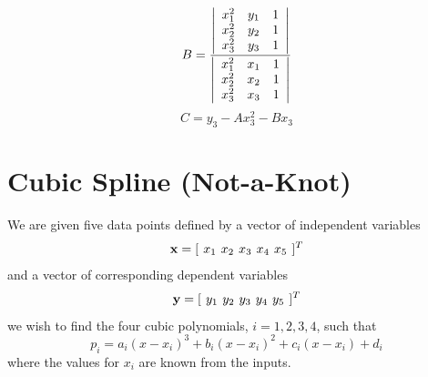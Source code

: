 %
\begin{equation}
    B = \frac{
    \left|%
    \begin{array}{ccc}
     x_1^2 & y_1 & 1 \\
     x_2^2 & y_2 & 1 \\
     x_3^2 & y_3 & 1 \\
    \end{array}%
    \right|
    }
    {    \left|%
    \begin{array}{ccc}
       x_1^2 & x_1 & 1 \\
       x_2^2 & x_2 & 1 \\
       x_3^2 & x_3 & 1 \\
    \end{array}%
    \right|}
\end{equation}
%
\begin{equation}
    C = y_3 - A x_3^2 - B x_3
\end{equation}

\section{Cubic Spline (Not-a-Knot) }

We are given five data points defined by a vector of independent
variables
%
\begin{equation}
     \mathbf{x} = [\hspace{.05 in} x_1 \hspace{.05 in} x_2 \hspace{.05 in}
     x_3 \hspace{.05 in} x_4 \hspace{.05 in} x_5 \hspace{.05
     in}]^T
\end{equation}
%
and a vector of corresponding dependent variables
%
\begin{equation}
     \mathbf{y} = [\hspace{.05 in} y_1 \hspace{.05 in} y_2 \hspace{.05 in}
     y_3 \hspace{.05 in} y_4 \hspace{.05 in} y_5 \hspace{.05
     in}]^T
\end{equation}
%
we wish to find the four cubic polynomials, $i = 1,2,3,4$, such
that
%
\begin{equation}
    p_i = a_i(x - x_i)^3 + b_i(x - x_i)^2 + c_i(x - x_i) + d_i
\end{equation}
%
where the values for $x_i$ are known from the inputs.

